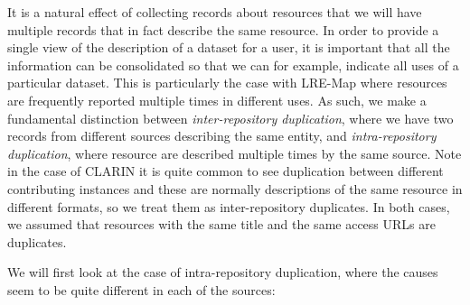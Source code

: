 \documentclass[smallextended]{svjour3}       %
\begin{document}
        
It is a natural effect of collecting records about resources that we will have
multiple records that in fact describe the same resource. In order to provide a
single view of the description of a dataset for a user, it is important that all
the information can be consolidated so that we can for example, indicate all
uses of a particular dataset. This is particularly the case with LRE-Map where
resources are frequently reported multiple times in different uses. As such, we 
make a fundamental distinction between \emph{inter-repository duplication},
where we have two records from different sources describing the same entity, and
\emph{intra-repository duplication}, where resource are described multiple times
by the same source. Note in the case of CLARIN it is quite common to see
duplication between different contributing instances and these are normally
descriptions of the same resource in different formats, so we treat them as
inter-repository duplicates. In both cases, we assumed that resources with the
same title and the same access URLs are duplicates. 

We will first look at the case of intra-repository duplication, where the causes
seem to be quite different in each of the sources:
\end{document}
